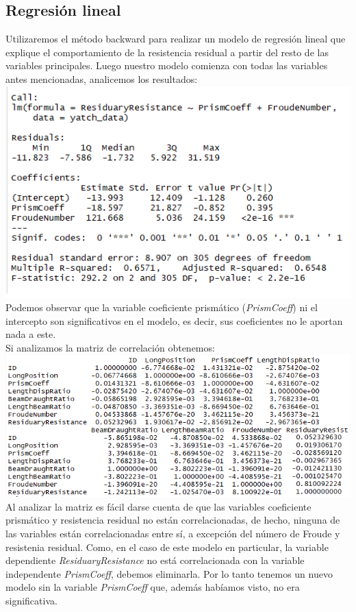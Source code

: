 \documentclass[twoside]{article}
\begin{document}
\begin{multicols}{2}
\section{Regresi\'on lineal}
Utilizaremos el m\'etodo backward para realizar un modelo de regresi\'on lineal que explique el comportamiento de la resistencia residual a partir del resto de las variables principales. Luego nuestro modelo comienza con todas las variables antes mencionadas, analicemos los resultados:\\

\includegraphics[scale = 0.5]{images/pic_01.png} \\

Podemos observar que la variable coeficiente prism\'atico (\textit{PrismCoeff}) ni el intercepto son significativos en el modelo, es decir, sus coeficientes no le aportan nada a este. \\
Si analizamos la matriz de correlaci\'on obtenemos: \\

\includegraphics[scale = 0.4]{images/pic_02.png} \\

Al analizar la matriz es f\'acil darse cuenta de que las variables coeficiente prism\'atico y resistencia residual no est\'an correlacionadas, de hecho, ninguna de las variables est\'an correlacionadas entre s\'i, a excepci\'on del n\'umero de Froude y resistenia residual. Como, en el caso de este modelo en particular, la variable dependiente \textit{ResiduaryResistance} no est\'a correlacionada con la variable independente \textit{PrismCoeff}, debemos eliminarla. Por lo tanto tenemos un nuevo modelo sin la variable \textit{PrismCoeff} que, adem\'as hab\'iamos visto, no era significativa.\\


\end{multicols}
\end{document}
